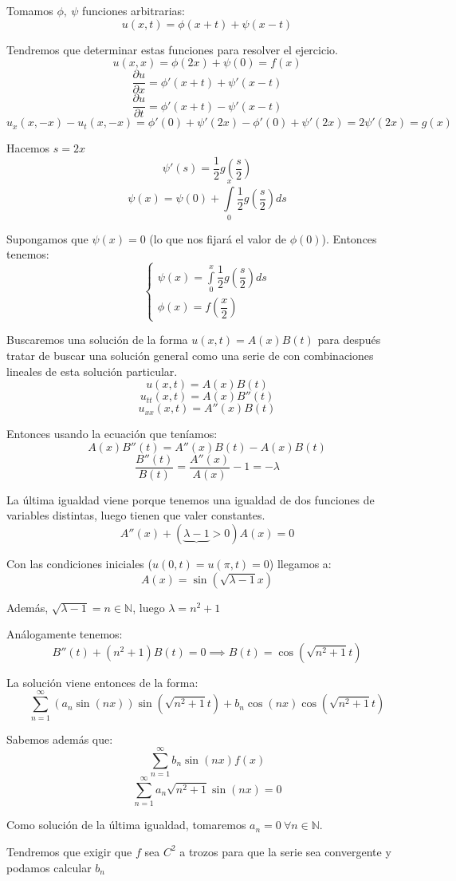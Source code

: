 \documentclass[openany]{book}
\begin{document}
\setcounter{ex}{0}

\begin{exercise}
  Tomamos $ \phi,\ \psi $ funciones arbitrarias:
  $$ u(x,t) = \phi(x+t) + \psi(x-t) $$

  Tendremos que determinar estas funciones para resolver el ejercicio.
  $$ u(x,x) = \phi(2x)+\psi(0) = f(x) $$
  $$ \dfrac{\partial u}{\partial x} = \phi'(x+t)+\psi'(x-t) $$
  $$ \dfrac{\partial u}{\partial t} = \phi'(x+t)-\psi'(x-t) $$
  $$ u_{x}(x,-x)-u_{t}(x,-x) = \phi'(0)+\psi'(2x)-\phi'(0)+\psi'(2x) = 2\psi'(2x) = g(x) $$
  
  Hacemos $ s = 2x $
  $$ \psi'(s) = \dfrac{1}{2}g\left(\dfrac{s}{2}\right) $$
  $$ \psi(x) = \psi(0)+ \int\limits_{0}^{x}\dfrac{1}{2}g\left(\dfrac{s}{2}\right)ds $$

  Supongamos que $ \psi(x)=0 $ (lo que nos fijará el valor de $ \phi(0) $). Entonces tenemos:
  $$ \left\{
  \begin{array}{l}
    \psi(x) = \int\limits_{0}^{x}\dfrac{1}{2}g\left(\dfrac{s}{2}\right)ds\\ 
    \phi(x) = f\left(\dfrac{x}{2}\right)  
  \end{array}
  \right. $$


\end{exercise}
\setcounter{ex}{2}

\begin{exercise}
  Buscaremos una solución de la forma $ u(x,t) = A(x)B(t) $ para después tratar de buscar una solución general como una serie de con combinaciones lineales de esta solución particular.
  $$ u(x,t) = A(x)B(t) $$
  $$ u_{tt}(x,t) = A(x)B''(t) $$
  $$ u_{xx}(x,t) = A''(x)B(t) $$
  
  Entonces usando la ecuación que teníamos:
  $$ A(x)B''(t) = A''(x)B(t) - A(x)B(t) $$
  $$ \dfrac{B''(t)}{B(t)} = \dfrac{A''(x)}{A(x)}-1 = -\lambda $$

  La última igualdad viene porque tenemos una igualdad de dos funciones de variables distintas, luego tienen que valer constantes.
  $$ A''(x) +(\underbrace{\lambda -1}>0)A(x) = 0 $$
  
  Con las condiciones iniciales ($ u(0,t)=u(\pi,t) = 0 $) llegamos a:
  $$ A(x) = \sin(\sqrt{\lambda-1}x) $$

  Además, $ \sqrt{\lambda-1} = n \in \mathbb{N}  $, luego $ \lambda = n^2+1 $

  Análogamente tenemos:
  $$ B''(t) +(n^2+1)B(t) = 0 \implies B(t) = \cos(\sqrt{n^2+1}t) $$

  La solución viene entonces de la forma:
  $$ \sum\limits_{n=1}^{\infty} (a_n \sin(nx)) \sin(\sqrt{n^2+1}t)+b_n \cos(nx)\cos(\sqrt{n^2+1}t) $$

  Sabemos además que:
  $$ \sum\limits_{n=1}^{\infty} b_n \sin(nx)f(x) $$
  $$ \sum\limits_{n=1}^{\infty} a_n \sqrt{n^2+1} \sin(nx) = 0 $$

  Como solución de la última igualdad, tomaremos $ a_n = 0 \ \forall  n \in \mathbb{N} $.

  Tendremos que exigir que $ f  $ sea $ C^2 $ a trozos para que la serie sea convergente y podamos calcular $ b_n $

\end{exercise}
\end{document}
